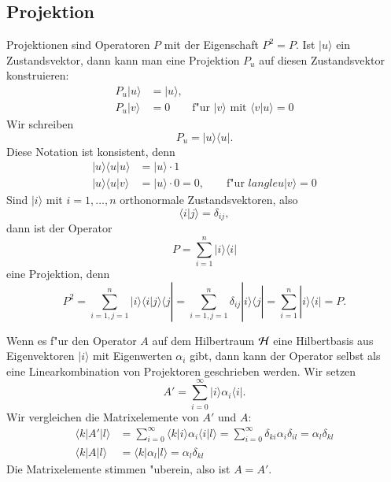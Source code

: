 \subsection{Projektion}
Projektionen sind Operatoren $P$ mit der Eigenschaft $P^2=P$.
Ist $|u\rangle$ ein Zustandsvektor, dann kann man eine Projektion $P_u$
auf diesen Zustandsvektor konstruieren:
\begin{align*}
P_u|u\rangle&=|u\rangle,\\
P_u|v\rangle&=0\qquad \text{f"ur $|v\rangle$ mit $\langle v|u\rangle=0$}
\end{align*}
Wir schreiben 
\[
P_u=
|u\rangle\langle u|
.
\]
Diese Notation ist konsistent, denn 
\begin{align*}
|u\rangle\langle u|u\rangle&=|u\rangle\cdot 1\\
|u\rangle\langle u|v\rangle&=|u\rangle\cdot 0=0,\qquad
\text{f"ur $langle u|v\rangle = 0$}
\end{align*}
Sind $|i\rangle$ mit $i=1,\dots, n$ orthonormale Zustandsvektoren, also
\[
\langle i|j\rangle =\delta_{ij},
\]
dann ist der Operator
\[
P=\sum_{i=1}^n |i\rangle \langle i|
\]
eine Projektion, denn
\[
P^2=
\sum_{i=1, j = 1}^n
|i\rangle \langle i|j\rangle \langle j|
=
\sum_{i=1, j = 1}^n
\delta_{ij} |i\rangle\langle j|=\sum_{i=1}^n|i\rangle\langle i|=P.
\]

Wenn es f"ur den Operator $A$ auf dem Hilbertraum $\cal H$ eine
Hilbertbasis aus Eigenvektoren $|i\rangle$ mit Eigenwerten $\alpha_i$ gibt,
dann kann der Operator selbst
als eine Linearkombination von Projektoren geschrieben werden. Wir setzen
\[
A'=\sum_{i=0}^\infty |i\rangle \alpha_i \langle i|.
\]
Wir vergleichen die Matrixelemente von $A'$ und $A$:
\begin{align*}
\langle k| A' |l\rangle
&=
\sum_{i=0}^\infty \langle k|i\rangle \alpha_i \langle i|l\rangle
=\sum_{i=0}^\infty \delta_{ki}\alpha_i\delta_{il}
=\alpha_l\delta_{kl}
\\
\langle k|A|l\rangle
&=
\langle k|\alpha_l|l\rangle=\alpha_l\delta_{kl}
\end{align*}
Die Matrixelemente stimmen "uberein, also ist $A=A'$.

